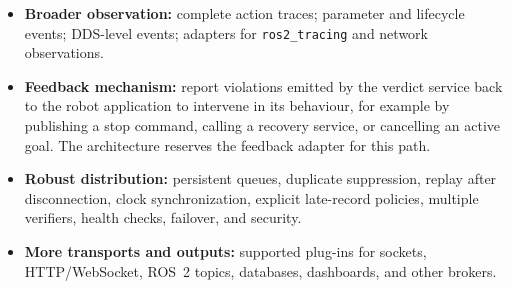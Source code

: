 \begin{itemize}
  \item \textbf{Broader observation:} complete action traces; parameter and
  lifecycle events; DDS-level events; adapters for \texttt{ros2\_tracing} and
  network observations.

  \item \textbf{Feedback mechanism:} report violations emitted by the verdict
  service back to the robot application to intervene in its
  behaviour, for example by publishing a stop command, calling a recovery
  service, or cancelling an active goal. The architecture reserves the
  feedback adapter for this path.

  \item \textbf{Robust distribution:} persistent queues, duplicate
  suppression, replay after disconnection, clock synchronization, explicit
  late-record policies, multiple verifiers, health checks, failover, and
  security.

  \item \textbf{More transports and outputs:} supported plug-ins for sockets,
  HTTP/WebSocket, ROS~2 topics, databases, dashboards, and other brokers.
\end{itemize}
